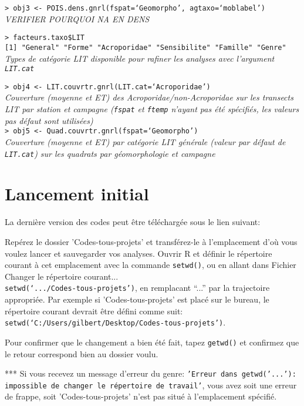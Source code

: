 \documentclass{article}
\begin{document}
\texttt{> obj3 <- POIS.dens.gnrl(fspat=`Geomorpho', agtaxo=`moblabel')}\\
\emph{VERIFIER POURQUOI NA EN DENS}

\texttt{> facteurs.taxo\$LIT}\\
\texttt{[1] "General"     "Forme"       "Acroporidae" "Sensibilite"
  "Famille" "Genre" }\\
\emph{Types de catégorie LIT disponible pour rafiner les analyses avec
l'argument \texttt{LIT.cat}}

\texttt{> obj4 <- LIT.couvrtr.gnrl(LIT.cat=`Acroporidae')}\\
\emph{Couverture (moyenne et ET) des Acroporidae/non-Acroporidae sur
  les transects LIT par station et campagne (\texttt{fspat} et
  \texttt{ftemp} n'ayant pas été spécifiés, les valeurs pas défaut
  sont utilisées)}\\

\texttt{> obj5 <- Quad.couvrtr.gnrl(fspat=`Geomorpho')}\\
\emph{Couverture (moyenne et ET) par catégorie LIT générale (valeur
  par défaut de \texttt{LIT.cat}) sur
  les quadrats par géomorphologie et campagne}\\

\section{Lancement initial}
La dernière version des codes peut être téléchargée sous le lien suivant:

Repérez le dossier 'Codes-tous-projets' et transférez-le à l'emplacement d'où vous
voulez lancer et sauvegarder vos analyses. Ouvrir
R et définir le répertoire courant à cet emplacement avec la commande
\texttt{setwd()}, ou en allant dans Fichier \ra Changer le répertoire courant...\\
\texttt{setwd(`.../Codes-tous-projets')}, en remplacant ``...''
par la trajectoire appropriée.  Par exemple si
'Codes-tous-projets' est placé sur le bureau, le répertoire courant
devrait être défini comme suit:\\
\texttt{setwd(`C:/Users/gilbert/Desktop/Codes-tous-projets')}.

Pour confirmer que le changement a bien été fait, tapez
\texttt{getwd()} et confirmez que le retour correspond bien au dossier
voulu.

*** Si vous recevez un message d'erreur du genre:
\texttt{'Erreur dans getwd('...'): impossible de changer le répertoire
  de travail'}, vous avez soit une erreur de frappe, soit
'Codes-tous-projets' n'est pas situé à l'emplacement spécifié.
\end{document}
